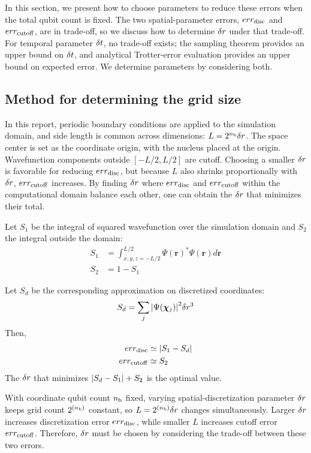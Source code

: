 \documentclass[a4paper,11pt]{article}
\begin{document}
In this section, we present how to choose parameters to reduce these errors when
the total qubit count is fixed. The two spatial-parameter errors,
$err_{\mathrm{disc}}$ and $err_{\mathrm{cutoff}}$, are in trade-off, so we discuss how to determine
$\delta r$ under that trade-off. For temporal parameter $\delta t$, no trade-off
exists; the sampling theorem provides an upper bound on $\delta t$, and
analytical Trotter-error evaluation provides an upper bound on expected error.
We determine parameters by considering both.

\subsection{Method for determining the grid size}
\label{subsec:delta-r-selection-method}
In this report, periodic boundary conditions are applied to the simulation
domain, and side length is common across dimensions: $L=2^{n_{\mathrm{b}}}\delta r$. The
space center is set as the coordinate origin, with the nucleus placed at the
origin. Wavefunction components outside $[-L/2,L/2]$ are cutoff. Choosing a
smaller $\delta r$ is favorable for reducing $err_{\mathrm{disc}}$, but because $L$ also
shrinks proportionally with $\delta r$, $err_{\mathrm{cutoff}}$ increases. By finding
$\delta r$ where $err_{\mathrm{disc}}$ and $err_{\mathrm{cutoff}}$ within the computational domain
balance each other, one can obtain the $\delta r$ that minimizes their total.

Let $S_1$ be the integral of squared wavefunction over the simulation domain and
$S_2$ the integral outside the domain:
\begin{align}
S_1 &= \int_{x,y,z=-L/2}^{L/2}\Psi(\bm{r})^{\ast}\Psi(\bm{r}) d\bm{r} \\
S_2 &= 1 - S_1
\end{align}


Let $S_d$ be the corresponding approximation on discretized coordinates:
\begin{equation}
S_d = \sum_{j}{\left| \Psi(\bm{\chi}_{j}) \right|}^2 \delta r^3
\end{equation}
Then,
\begin{align}
err_{\mathrm{disc}} &\simeq {\left| S_1 - S_d \right|} \label{eq:err-disc-definition}\\
err_{\mathrm{cutoff}} &\simeq S_2 \label{eq:err-cutoff-definition}
\end{align}
The $\delta r$ that minimizes ${\left| S_d-S_1 \right|}+S_2$ is the optimal value.

With coordinate qubit count $n_{\mathrm{b}}$ fixed, varying spatial-discretization
parameter $\delta r$ keeps grid count $2^{(n_{\mathrm{b}})}$ constant, so
$L=2^{(n_{\mathrm{b}})}\delta r$ changes simultaneously. Larger $\delta r$ increases
discretization error $err_{\mathrm{disc}}$, while smaller $L$ increases cutoff error
$err_{\mathrm{cutoff}}$. Therefore, $\delta r$ must be chosen by considering the trade-off
between these two errors.
\end{document}
